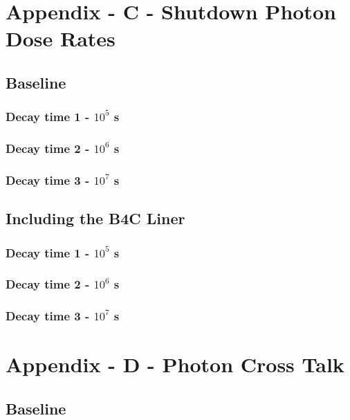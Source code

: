 \documentclass[12pt]{article}
\begin{document}
\section{Appendix - C - Shutdown Photon Dose Rates}
\subsection{Baseline}
\subsubsection{Decay time 1 - $10^5$ s}

\clearpage
\subsubsection{Decay time 2 - $10^6$ s}

\clearpage
\subsubsection{Decay time 3 - $10^7$ s}

\clearpage
\subsection{Including the B4C Liner}
\subsubsection{Decay time 1 - $10^5$ s}

\clearpage
\subsubsection{Decay time 2 - $10^6$ s}

\clearpage
\subsubsection{Decay time 3 - $10^7$ s}


\newpage
\clearpage
\section{Appendix - D - Photon Cross Talk}
\subsection{Baseline}
\end{document}
